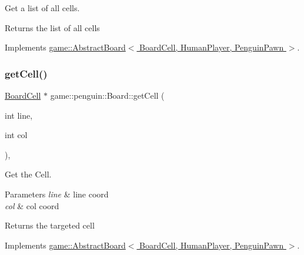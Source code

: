 Get a list of all cells. 

\begin{DoxyReturn}{Returns}
the list of all cells 
\end{DoxyReturn}


Implements \hyperlink{classgame_1_1_abstract_board_a73d6bef66826688cd6e2bc0f37acb4b0}{game\+::\+Abstract\+Board$<$ Board\+Cell, Human\+Player, Penguin\+Pawn $>$}.

\mbox{\label{classgame_1_1penguin_1_1_board_ac9fbe04a302208fcb5f66e717182b6d4}} 
\subsubsection{\texorpdfstring{get\+Cell()}{getCell()}}
{\footnotesize\ttfamily \hyperlink{classgame_1_1penguin_1_1_board_cell}{Board\+Cell} $\ast$ game\+::penguin\+::\+Board\+::get\+Cell (\begin{DoxyParamCaption}\item[{int}]{line,  }\item[{int}]{col }\end{DoxyParamCaption})\hspace{0.3cm}{\ttfamily [override]}, {\ttfamily [virtual]}}



Get the Cell. 


\begin{DoxyParams}{Parameters}
{\em line} & line coord \\
\hline
{\em col} & col coord \\
\hline
\end{DoxyParams}
\begin{DoxyReturn}{Returns}
the targeted cell 
\end{DoxyReturn}


Implements \hyperlink{classgame_1_1_abstract_board_af02030d0ae3f44b95fff7c8012e7a066}{game\+::\+Abstract\+Board$<$ Board\+Cell, Human\+Player, Penguin\+Pawn $>$}.

